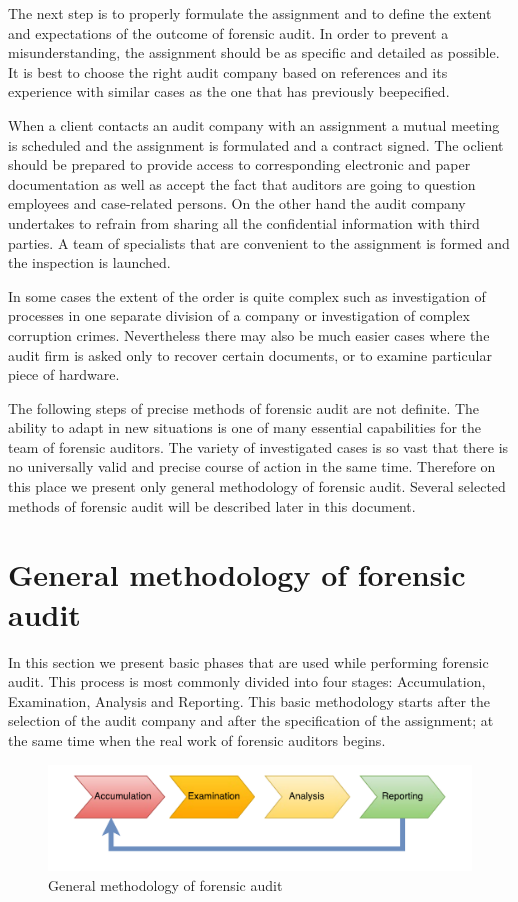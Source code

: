 The next step is to properly formulate the assignment and to define the extent and expectations of the outcome of forensic audit. In order to prevent a misunderstanding, the assignment should be as specific and detailed as possible. It is best to choose the right audit company based on references and its experience with similar cases as the one that has previously beepecified.

When a client contacts an audit company with an assignment a mutual meeting is scheduled and the assignment is formulated and a contract signed. The oclient should be prepared to provide access to corresponding electronic and paper documentation as well as accept the fact that auditors are going to question employees and case-related persons. On the other hand the audit company undertakes to refrain from sharing all the confidential information with third parties. A team of specialists that are convenient to the assignment is formed and the inspection is launched. 

In some cases the extent of the order is quite complex such as investigation of processes in one separate division of a company or investigation of complex corruption crimes. Nevertheless there may also be much easier cases where the audit firm is asked only to recover certain documents, or to examine particular piece of hardware. 

The following steps of precise methods of forensic audit are not definite. The ability to adapt in new situations is one of many essential capabilities for the team of forensic auditors. The variety of investigated cases is so vast that there is no universally valid and precise course of action in the same time. Therefore on this place we present only general methodology of forensic audit. Several selected methods of forensic audit will be described later in this document. 

\section{General methodology of forensic audit}
In this section we present basic phases that are used while performing forensic audit. This process is most commonly divided into four stages: Accumulation, Examination, Analysis and Reporting. This basic methodology starts after the  selection of the audit company and after the specification of the assignment; at the same time when the real work of forensic auditors begins.

\begin{figure}[h]
	\begin{center} 
	\includegraphics[width=1.0\textwidth]{img/general_methodology.pdf}
	\end{center}
	\caption{General methodology of forensic audit}
\end{figure}

